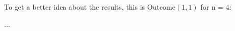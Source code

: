 \begin{example}
To get a better idea about the results, this is $\textrm{Outcome}(1, 1)$ for n = 4:

...

\end{example}
